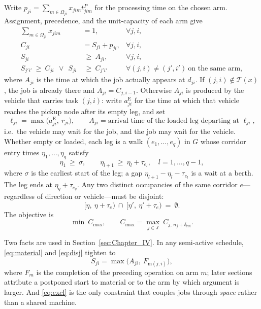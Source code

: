 Write $p_{ji}=\sum_{m\in\Omega_{ji}}x_{jim}t^P_{jim}$ for the processing time on the chosen arm. Assignment, precedence, and the unit-capacity of each arm give
\begin{align}
\sum_{m\in\Omega_{ji}} x_{jim} &= 1, & \forall j,i,
\label{eq:assign}\\
C_{ji} &= S_{ji}+p_{ji}, & \forall j,i,
\label{eq:dur}\\
S_{ji} &\ \ge\ A_{ji}, & \forall j,i,
\label{eq:material}\\
S_{j'i'}\ \ge\ C_{ji}\ \ \vee\ \ S_{ji} &\ \ge\ C_{j'i'}
& \forall (j,i)\neq(j',i')\ \text{on the same arm},
\label{eq:disj}
\end{align}
where $A_{ji}$ is the time at which the job actually appears at $d_{ji}$.
If $(j,i)\notin\mathcal{T}(x)$, the job is already there and $A_{ji}=C_{j,i-1}$.
Otherwise $A_{ji}$ is produced by the vehicle that carries task $(j,i)$: write $a^{\mathrm{E}}_{ji}$ for the time at which that vehicle reaches the pickup node after its empty leg, and set
\begin{equation}
\label{eq:load}
\ell_{ji}=\max\bigl(a^{\mathrm{E}}_{ji},\ r_{ji}\bigr),
\qquad
A_{ji}=\text{arrival time of the loaded leg departing at }\ell_{ji},
\end{equation}
i.e.\ the vehicle may wait for the job, and the job may wait for the vehicle.
Whether empty or loaded, each leg is a walk $(e_1,\dots,e_q)$ in $G$ whose corridor entry times $\eta_1,\dots,\eta_q$ satisfy
\begin{equation}
\label{eq:walk}
\eta_1 \ \ge\ \sigma, \qquad
\eta_{l+1}\ \ge\ \eta_l+\tau_{e_l}, \quad l=1,\dots,q-1,
\end{equation}
where $\sigma$ is the earliest start of the leg; a gap $\eta_{l+1}-\eta_l-\tau_{e_l}$ is a wait at a berth.
The leg ends at $\eta_q+\tau_{e_q}$.
Any two distinct occupancies of the same corridor $e$---regardless of direction or vehicle---must be disjoint:
\begin{equation}
\label{eq:excl}
\bigl[\eta,\ \eta+\tau_e\bigr)\ \cap\
\bigl[\eta',\ \eta'+\tau_e\bigr)\ =\ \emptyset .
\end{equation}
The objective is
\begin{equation}
\label{eq:obj}
\min\ C_{\max},\qquad
C_{\max}=\max_{j\in J}\ C_{j,\,n_j+\delta_{\mathrm{ret}}} .
\end{equation}

Two facts are used in Section~\ref{sec:Chapter_IV}.
In any semi-active schedule, \eqref{eq:material} and \eqref{eq:disj} tighten to
\begin{equation}
\label{eq:bind}
S_{ji}=\max\bigl(A_{ji},\ F_{\mathrm{m}(j,i)}\bigr),
\end{equation}
where $F_m$ is the completion of the preceding operation on arm $m$; later sections attribute a postponed start to material or to the arm by which argument is larger.
And \eqref{eq:excl} is the only constraint that couples jobs through \emph{space} rather than a shared machine.

